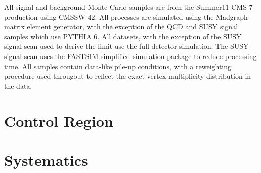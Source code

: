 

All signal and background Monte Carlo samples are from the Summer11 \ac{CMS}
\unit{7}{\TeV} production using \ac{CMSSW} 42. All processes are simulated using
the Madgraph matrix element generator, with the exception of the \ac{QCD} and
\ac{SUSY} signal samples which use \ac{PYTHIA} 6. All datasets, with the
exception of the \ac{SUSY} signal scan used to derive the limit use the full
detector simulation. The \ac{SUSY} signal scan uses the \ac{FASTSIM} simplified
simulation package to reduce processing time. All samples contain data-like
pile-up conditions, with a reweighting procedure used througout to reflect the
exact vertex multiplicity distribution in the data.


\section{Control Region}

\begin{figure}
\centering
{}\quad
{}\quad
{}
\caption[]{}
\label{fig:susy_mucontrol_kin}
\end{figure}

\begin{figure}
\centering
{}\quad
{}\quad
{}
\caption[]{}
\label{fig:susy_mucontrol_lp}
\end{figure}

%

\section{Systematics}
\label{sec:susy_systematics}





